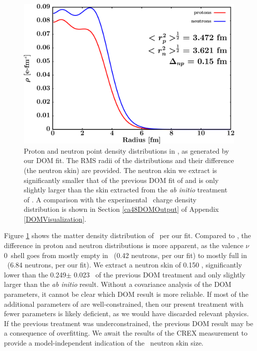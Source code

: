 \begin{figure}[tb]
    \centering
    \includegraphics[width=\textwidth]{figures/ca48_matterDensity.png}
    \caption[Proton and neutron matter density distributions in \caEight]
    {
        Proton and neutron point density distributions in \caEight, as
        generated by our DOM fit. The RMS radii of the distributions and their
        difference (the neutron skin) are provided. The neutron
        skin we extract is significantly smaller
        that of the previous DOM fit of \cite{MahzoonPhDThesis} and is only
        slightly larger than the skin extracted from the \textit{ab initio}
        treatment of \cite{Hagen2016}. A comparison with the
        experimental \caEight\ charge density distribution is shown in Section
        \ref{ca48DOMOutput} of Appendix \ref{DOMVisualization}.
    }
    \label{Ca48MatterDist}
\end{figure}

Figure \ref{Ca48MatterDist} shows the matter density distribution of \caEight\ per
our fit. Compared to \caForty, the difference in proton and neutron distributions is more apparent,
as the valence $\nu$0\fSeven\ shell goes
from mostly empty in \caForty\ (0.42 neutrons, per our fit) to 
mostly full in \caEight\ (6.84 neutrons, per our fit).
We extract a neutron skin of 0.150 \femto\meter,
significantly lower than the 0.249$\pm$ 0.023 \femto\meter\ of the previous DOM treatment
and only slightly larger than the \textit{ab initio} result. Without a covariance analysis of the DOM
parameters, it cannot be clear which DOM result is more reliable.
If most of the additional parameters of
\cite{MahzoonPhDThesis} are well-constrained, then our present treatment with fewer parameters is 
likely deficient, as we would have discarded relevant physics. If the previous treatment
was underconstrained, the previous DOM result may be a consequence of overfitting. We
await the results of the CREX measurement to provide a model-independent indication
of the \caEight\ neutron skin size.

